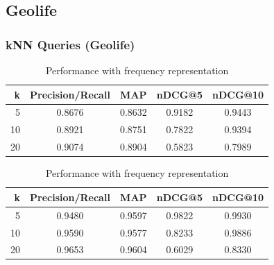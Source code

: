 \documentclass{beamer}
\begin{document}

\subsection{Geolife}

\begin{frame}
\frametitle{kNN Queries (Geolife)} 
\begin{block}{} \vspace{-3mm}
\begin{table}[!htbp]
{\footnotesize
\centering
\begin{tabular}{rcccc}
 	{\bf k } 	& {\bf Precision/Recall}	&	{\bf MAP}	 & {\bf nDCG@5}	& {\bf nDCG@10} \\ \midrule
 	 5   		& 	0.8676   			&	0.8632	& 0.9182		& 0.9443	\\ \midrule
	10   		& 	0.8921    		 	&	0.8751	& 0.7822		& 0.9394	\\ \midrule
 	20  		&   	0.9074   			&	0.8904	& 0.5823  		& 0.7989	\\ \bottomrule\end{tabular} 
\caption{\footnotesize Performance with binary representation} \vspace{3mm}

\centering
\begin{tabular}{rcccc}
 	{\bf k } 	& {\bf Precision/Recall}	&	{\bf MAP}	 & {\bf nDCG@5}	& {\bf nDCG@10} \\ \midrule
 	 5   		& 	0.9480   		 	&	0.9597	 & 0.9822			& 0.9930	\\ \midrule
	10   		& 	0.9590    		 	&	0.9577	 & 0.8233			& 0.9886	\\ \midrule
 	20  		&   	0.9653   			&	0.9604	 & 0.6029  		& 0.8330	\\ \bottomrule
\end{tabular} 
\caption{\footnotesize Performance with frequency representation}
\label{table: Geolife binary} 
}
\end{table}
\end{block}
\end{frame}
\end{document}
